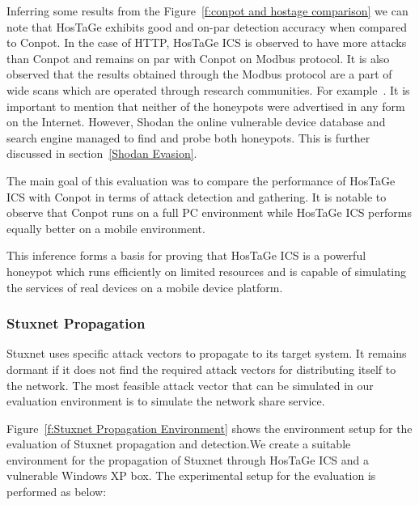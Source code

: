 \documentclass[article,msc=informatik,type=msc,colorback,accentcolor=tud9c]{tudthesis}
\begin{document}
		
		
		
		\vspace{5mm} 
		Inferring some results from the Figure~\ref{f:conpot and hostage comparison} we can note that HosTaGe exhibits good and on-par detection accuracy when compared to Conpot. In the case of HTTP, HosTaGe ICS is observed to have more attacks than Conpot and remains on par with Conpot on Modbus protocol. It is also observed that the results obtained through the Modbus protocol are a part of wide scans which are operated through research communities. For example~\cite{durumeric2013zmap}.
		It is important to mention that neither of the honeypots were advertised in any form on the Internet. However, Shodan the online vulnerable device database and search engine managed to find and probe both honeypots. This is further discussed in section~\ref{Shodan Evasion}.
		
		\vspace{3mm}
		The main goal of this evaluation was to compare the performance of HosTaGe ICS with Conpot in terms of attack detection and gathering. It is notable to observe that Conpot runs on a full PC environment while HosTaGe ICS performs equally better on a mobile environment.
		
		\vspace{3mm}
		This inference forms a basis for proving that HosTaGe ICS is a powerful honeypot which runs efficiently on limited resources and is capable of simulating the services of real devices on a mobile device platform. 	
	
		
	\subsubsection{Stuxnet Propagation}\label{Stuxnet Propagation}
	
	Stuxnet uses specific attack vectors to propagate to its target system. It remains dormant if it does not find the required attack vectors for distributing itself to the network. The most feasible attack vector that can be simulated in our evaluation environment is to simulate the network share service. 


	\vspace{3mm}
	Figure~\ref{f:Stuxnet Propagation Environment} shows the environment setup for the evaluation of Stuxnet propagation and detection.We create a suitable environment for the propagation of Stuxnet through HosTaGe ICS and a vulnerable Windows XP box. The experimental setup for the evaluation is performed as below:
	
\end{document}
